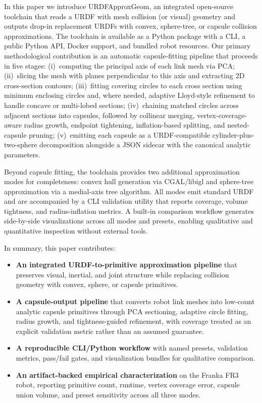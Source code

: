 In this paper we introduce URDFApproxGeom, an integrated open-source toolchain that reads a URDF with mesh collision (or visual) geometry and outputs drop-in replacement URDFs with convex, sphere-tree, or capsule collision approximations.
The toolchain is available as a Python package with a CLI, a public Python API, Docker support, and bundled robot resources.
Our primary methodological contribution is an automatic capsule-fitting pipeline that proceeds in five stages:
(i)~computing the principal axis of each link mesh via PCA;
(ii)~slicing the mesh with planes perpendicular to this axis and extracting 2D cross-section contours;
(iii)~fitting covering circles to each cross section using minimum enclosing circles and, where needed, adaptive Lloyd-style refinement to handle concave or multi-lobed sections;
(iv)~chaining matched circles across adjacent sections into capsules, followed by collinear merging, vertex-coverage-aware radius growth, endpoint tightening, inflation-based splitting, and nested-capsule pruning;
(v)~emitting each capsule as a URDF-compatible cylinder-plus-two-sphere decomposition alongside a JSON sidecar with the canonical analytic parameters.

Beyond capsule fitting, the toolchain provides two additional approximation modes for completeness: convex hull generation via CGAL/libigl and sphere-tree approximation via a medial-axis tree algorithm.
All modes emit standard URDF and are accompanied by a CLI validation utility that reports coverage, volume tightness, and radius-inflation metrics.
A built-in comparison workflow generates side-by-side visualizations across all modes and presets, enabling qualitative and quantitative inspection without external tools.

In summary, this paper contributes:
\begin{itemize}
    \item \textbf{An integrated URDF-to-primitive approximation pipeline} that preserves visual, inertial, and joint structure while replacing collision geometry with convex, sphere, or capsule primitives.
    \item \textbf{A capsule-output pipeline} that converts robot link meshes into low-count analytic capsule primitives through PCA sectioning, adaptive circle fitting, radius growth, and tightness-guided refinement, with coverage treated as an explicit validation metric rather than an assumed guarantee.
    \item \textbf{A reproducible CLI/Python workflow} with named presets, validation metrics, pass/fail gates, and visualization bundles for qualitative comparison.
    \item \textbf{An artifact-backed empirical characterization} on the Franka FR3 robot, reporting primitive count, runtime, vertex coverage error, capsule union volume, and preset sensitivity across all three modes.
\end{itemize}
